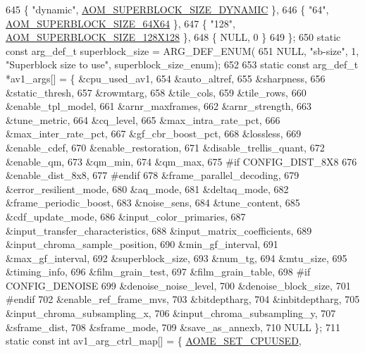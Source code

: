 \begin{DoxyCodeInclude}
{{{{{{{645     \{ \textcolor{stringliteral}{"dynamic"}, \hyperlink{group__codec_ggac34a24f7c6c0fef7518aed0da4425f61aaabb4d9ad771b2fa177ff6fb5437b179}{AOM\_SUPERBLOCK\_SIZE\_DYNAMIC} \},
646     \{ \textcolor{stringliteral}{"64"}, \hyperlink{group__codec_ggac34a24f7c6c0fef7518aed0da4425f61a5abd24080a18d4f7e33217d93a73e968}{AOM\_SUPERBLOCK\_SIZE\_64X64} \},
647     \{ \textcolor{stringliteral}{"128"}, \hyperlink{group__codec_ggac34a24f7c6c0fef7518aed0da4425f61a17127133dafcd42b1d792770981d67d0}{AOM\_SUPERBLOCK\_SIZE\_128X128} \},
648     \{ NULL, 0 \}
649 \};
650 \textcolor{keyword}{static} \textcolor{keyword}{const} arg\_def\_t superblock\_size = ARG\_DEF\_ENUM(
651     NULL, \textcolor{stringliteral}{"sb-size"}, 1, \textcolor{stringliteral}{"Superblock size to use"}, superblock\_size\_enum);
652 
653 \textcolor{keyword}{static} \textcolor{keyword}{const} arg\_def\_t *av1\_args[] = \{ &cpu\_used\_av1,
654     &auto\_altref,
655     &sharpness,
656     &static\_thresh,
657     &rowmtarg,
658     &tile\_cols,
659     &tile\_rows,
660     &enable\_tpl\_model,
661     &arnr\_maxframes,
662     &arnr\_strength,
663     &tune\_metric,
664     &cq\_level,
665     &max\_intra\_rate\_pct,
666     &max\_inter\_rate\_pct,
667     &gf\_cbr\_boost\_pct,
668     &lossless,
669     &enable\_cdef,
670     &enable\_restoration,
671     &disable\_trellis\_quant,
672     &enable\_qm,
673     &qm\_min,
674     &qm\_max,
675 \textcolor{preprocessor}{#if CONFIG\_DIST\_8X8}
676     &enable\_dist\_8x8,
677 \textcolor{preprocessor}{#endif}
678     &frame\_parallel\_decoding,
679     &error\_resilient\_mode,
680     &aq\_mode,
681     &deltaq\_mode,
682     &frame\_periodic\_boost,
683     &noise\_sens,
684     &tune\_content,
685     &cdf\_update\_mode,
686     &input\_color\_primaries,
687     &input\_transfer\_characteristics,
688     &input\_matrix\_coefficients,
689     &input\_chroma\_sample\_position,
690     &min\_gf\_interval,
691     &max\_gf\_interval,
692     &superblock\_size,
693     &num\_tg,
694     &mtu\_size,
695     &timing\_info,
696     &film\_grain\_test,
697     &film\_grain\_table,
698 \textcolor{preprocessor}{#if CONFIG\_DENOISE}
699     &denoise\_noise\_level,
700     &denoise\_block\_size,
701 \textcolor{preprocessor}{#endif}
702     &enable\_ref\_frame\_mvs,
703     &bitdeptharg,
704     &inbitdeptharg,
705     &input\_chroma\_subsampling\_x,
706     &input\_chroma\_subsampling\_y,
707     &sframe\_dist,
708     &sframe\_mode,
709     &save\_as\_annexb,
710     NULL \};
711 \textcolor{keyword}{static} \textcolor{keyword}{const} \textcolor{keywordtype}{int} av1\_arg\_ctrl\_map[] = \{ \hyperlink{group__aom__encoder_ggae78dde67a6d78f332e9bdba0dde42db5adac09e1a8da079b08fca5ccbf981f1a6}{AOME\_SET\_CPUUSED},
}}}}}}}
\end{DoxyCodeInclude}
